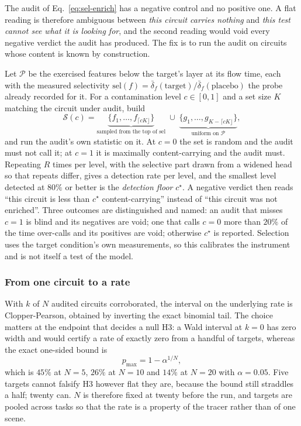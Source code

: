 The audit of Eq.~\ref{eq:sel-enrich} has a negative control and no positive
one. A flat reading is therefore ambiguous between \emph{this circuit carries
nothing} and \emph{this test cannot see what it is looking for}, and the second
reading would void every negative verdict the audit has produced. The fix is to
run the audit on circuits whose content is known by construction.

Let $\mathcal{P}$ be the exercised features below the target's layer at its
flow time, each with the measured selectivity $\mathrm{sel}(f)=
\bar{\delta}_f(\mathrm{target})/\bar{\delta}_f(\mathrm{placebo})$ the probe
already recorded for it. For a contamination level $c\in[0,1]$ and a set size
$K$ matching the circuit under audit, build
\begin{equation}
\mathcal{S}(c)=\underbrace{\{f_1,\dots,f_{\lceil cK\rfloor}\}}
_{\text{sampled from the top of }\mathrm{sel}}
\;\cup\;
\underbrace{\{g_1,\dots,g_{K-\lceil cK\rfloor}\}}_{\text{uniform on }\mathcal{P}},
\label{eq:contamination}
\end{equation}
and run the audit's own statistic on it. At $c=0$ the set is random and the
audit must not call it; at $c=1$ it is maximally content-carrying and the audit
must. Repeating $R$ times per level, with the selective part drawn from a
widened head so that repeats differ, gives a detection rate per level, and the
smallest level detected at $80\%$ or better is the \emph{detection floor}
$c^{\star}$. A negative verdict then reads ``this circuit is less than
$c^{\star}$ content-carrying'' instead of ``this circuit was not enriched''.
Three outcomes are distinguished and named: an audit that misses $c=1$ is
blind and its negatives are void; one that calls $c=0$ more than $20\%$ of the
time over-calls and its positives are void; otherwise $c^{\star}$ is reported.
Selection uses the target condition's own measurements, so this calibrates the
instrument and is not itself a test of the model.

\subsubsection{From one circuit to a rate}
\label{sec:rate}

With $k$ of $N$ audited circuits corroborated, the interval on the underlying
rate is Clopper-Pearson, obtained by inverting the exact binomial tail. The
choice matters at the endpoint that decides a null H3: a Wald interval at $k=0$
has zero width and would certify a rate of exactly zero from a handful of
targets, whereas the exact one-sided bound is
\begin{equation}
p_{\max}=1-\alpha^{1/N},
\label{eq:cp-zero}
\end{equation}
which is $45\%$ at $N=5$, $26\%$ at $N=10$ and $14\%$ at $N=20$ with
$\alpha=0.05$. Five targets cannot falsify H3 however flat they are, because
the bound still straddles a half; twenty can. $N$ is therefore fixed at twenty
before the run, and targets are pooled across tasks so that the rate is a
property of the tracer rather than of one scene.

